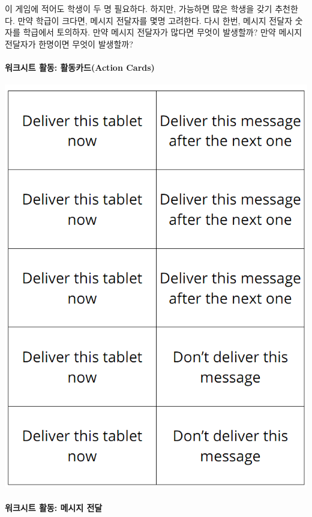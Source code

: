 \documentclass[]{article}
\begin{document}
이 게임에 적어도 학생이 두 명 필요하다. 하지만, 가능하면 많은 학생을
갖기 추천한다. 만약 학급이 크다면, 메시지 전달자를 몇명 고려한다. 다시
한번, 메시지 전달자 숫자를 학급에서 토의하자. 만약 메시지 전달자가
많다면 무엇이 발생할까? 만약 메시지 전달자가 한명이면 무엇이 발생할까?

\mbox{}\paragraph{워크시트 활동: 활동카드(Action Cards)}\label{action-cards}

\includegraphics{csunplugged/02-part/img/ch11-internet/11-internet-action-cards.png}

\mbox{}\paragraph{워크시트 활동: 메시지 전달}\label{section-151}
\end{document}
